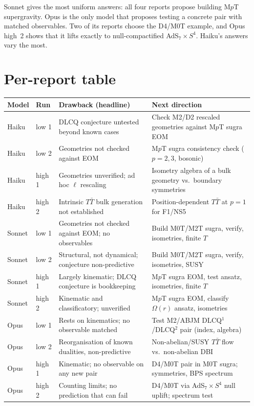 \documentclass[11pt]{article}
\begin{document}
\noindent Sonnet gives the most uniform answers: all four reports propose building M$p$T supergravity. Opus is the only model that proposes testing a concrete pair with matched observables. Two of its reports choose the D4/M0T example, and Opus high~2 shows that it lifts exactly to null-compactified AdS$_7\times S^4$. Haiku's answers vary the most.

\section*{Per-report table}

\small
\begin{tabularx}{\textwidth}{l l L L}
\toprule
Model & Run & Drawback (headline) & Next direction\\
\midrule
Haiku & low 1 & DLCQ conjecture untested beyond known cases & Check M2/D2 rescaled geometries against M$p$T sugra EOM\\
Haiku & low 2 & Geometries not checked against EOM & M$p$T sugra consistency check ($p=2,3$, bosonic)\\
Haiku & high 1 & Geometries unverified; ad hoc $\ell$ rescaling & Isometry algebra of a bulk geometry vs.\ boundary symmetries\\
Haiku & high 2 & Intrinsic $T\bar T$ bulk generation not established & Position-dependent $T\bar T$ at $p=1$ for F1/NS5\\
\midrule
Sonnet & low 1 & Geometries not checked against EOM; no observables & Build M0T/M2T sugra, verify, isometries, finite $T$\\
Sonnet & low 2 & Structural, not dynamical; conjecture non-predictive & Build M0T/M2T sugra, verify, isometries, SUSY\\
Sonnet & high 1 & Largely kinematic; DLCQ conjecture is bookkeeping & M$p$T sugra EOM, test ansatz, isometries, finite $T$\\
Sonnet & high 2 & Kinematic and classificatory; unverified & M$p$T sugra EOM, classify $\Omega(r)$ ansatz, isometries\\
\midrule
Opus & low 1 & Rests on kinematics; no observable matched & Test M2/ABJM DLCQ$^1$/DLCQ$^2$ pair (index, algebra)\\
Opus & low 2 & Reorganisation of known dualities, non-predictive & Non-abelian/SUSY $T\bar T$ flow vs.\ non-abelian DBI\\
Opus & high 1 & Kinematic; no observable on any new pair & D4/M0T pair in M0T sugra; symmetries, BPS spectrum\\
Opus & high 2 & Counting limits; no prediction that can fail & D4/M0T via AdS$_7\times S^4$ null uplift; spectrum test\\
\bottomrule
\end{tabularx}
\end{document}
